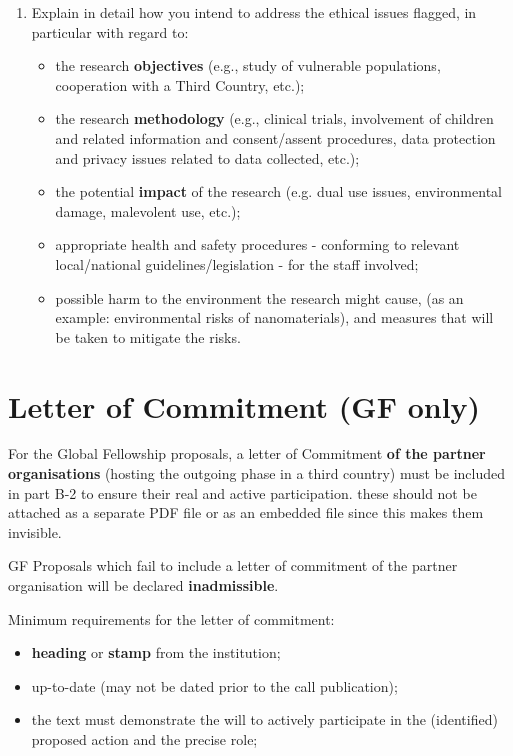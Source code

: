 \bigskip
{\bf 
\begin{enumerate}[leftmargin=*, label=\arabic*), start=2]
  \item Explain in detail how you intend to address the ethical issues flagged, in particular with regard to: 
  \begin{itemize}
    \item {\normalfont the research {\bf objectives} (e.g., study of vulnerable populations, cooperation with a Third Country, etc.);}
    \item {\normalfont the research {\bf methodology} (e.g., clinical trials, involvement of children and related information and consent/assent procedures, data protection and privacy issues related to data collected, etc.);}
    \item {\normalfont the potential {\bf impact} of the research (e.g. dual use issues, environmental damage, malevolent use, etc.);}
    \item {\normalfont appropriate health and safety procedures - conforming to relevant local/national guidelines/legislation - for the staff involved;}
    \item {\normalfont possible harm to the environment the research might cause, (as an example: environmental risks of nanomaterials), and measures that will be taken to mitigate the risks.}
  \end{itemize}
\end{enumerate}
}




\newpage
\section{Letter of Commitment (GF only)}
\label{sec:letters}

For the Global Fellowship proposals, a letter of Commitment \textbf{of the partner
organisations} (hosting the outgoing phase in a third country) must be included in part
B-2 to ensure their real and active participation. these should not be attached as a
separate PDF file or as an embedded file since this makes them invisible.

\medskip\noindent
GF Proposals which fail to include a letter of commitment of the partner organisation
will be declared \textbf{inadmissible}.

\medskip\noindent
Minimum requirements for the letter of commitment: 

\begin{itemize}
  \item \textbf{heading} or \textbf{stamp} from the institution; 
  \item up-to-date (may not be dated prior to the call publication); 
  \item the text must demonstrate the will to actively participate in the (identified) proposed action and the precise role;
\end{itemize}


